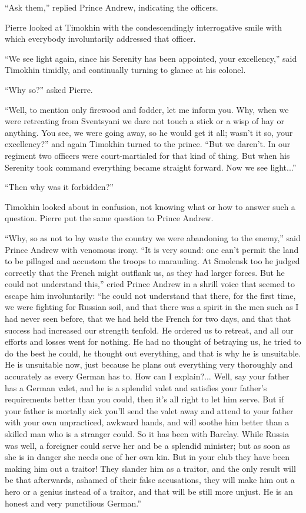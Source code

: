 ``Ask them,'' replied Prince Andrew, indicating the officers.

Pierre looked at Timokhin with the condescendingly interrogative
smile with which everybody involuntarily addressed that officer.

``We see light again, since his Serenity has been appointed, your
excellency,'' said Timokhin timidly, and continually turning to
glance at his colonel.

``Why so?'' asked Pierre.

``Well, to mention only firewood and fodder, let me inform
you. Why, when we were retreating from Sventsyani we dare not
touch a stick or a wisp of hay or anything. You see, we were
going away, so he would get it all; wasn't it so, your
excellency?'' and again Timokhin turned to the prince.  ``But we
daren't. In our regiment two officers were court-martialed for
that kind of thing. But when his Serenity took command everything
became straight forward. Now we see light...''

``Then why was it forbidden?''

Timokhin looked about in confusion, not knowing what or how to
answer such a question. Pierre put the same question to Prince
Andrew.

``Why, so as not to lay waste the country we were abandoning to
the enemy,'' said Prince Andrew with venomous irony. ``It is very
sound: one can't permit the land to be pillaged and accustom the
troops to marauding. At Smolensk too he judged correctly that the
French might outflank us, as they had larger forces. But he could
not understand this,'' cried Prince Andrew in a shrill voice that
seemed to escape him involuntarily: ``he could not understand
that there, for the first time, we were fighting for Russian
soil, and that there was a spirit in the men such as I had never
seen before, that we had held the French for two days, and that
that success had increased our strength tenfold. He ordered us to
retreat, and all our efforts and losses went for nothing.  He had
no thought of betraying us, he tried to do the best he could, he
thought out everything, and that is why he is unsuitable. He is
unsuitable now, just because he plans out everything very
thoroughly and accurately as every German has to. How can I
explain?... Well, say your father has a German valet, and he is a
splendid valet and satisfies your father's requirements better
than you could, then it's all right to let him serve. But if your
father is mortally sick you'll send the valet away and attend to
your father with your own unpracticed, awkward hands, and will
soothe him better than a skilled man who is a stranger could.  So
it has been with Barclay. While Russia was well, a foreigner
could serve her and be a splendid minister; but as soon as she is
in danger she needs one of her own kin. But in your club they
have been making him out a traitor! They slander him as a
traitor, and the only result will be that afterwards, ashamed of
their false accusations, they will make him out a hero or a
genius instead of a traitor, and that will be still more
unjust. He is an honest and very punctilious German.''

